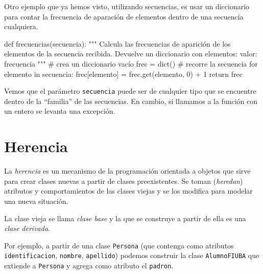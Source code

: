 Otro ejemplo que ya hemos visto, utilizando secuencias, es usar un
diccionario para contar la frecuencia de aparación de elementos dentro de
una secuencia cualquiera.

\begin{codigo-python}
def frecuencias(secuencia):
    """ Calcula las frecuencias de aparición de los elementos de
        la secuencia recibida.
        Devuelve un diccionario con elementos: {valor: frecuencia}
    """
    # crea un diccionario vacío
    frec = dict()
    # recorre la secuencia
    for elemento in secuencia:
        frec[elemento] = frec.get(elemento, 0) + 1
    return frec
\end{codigo-python}

Vemos que el parámetro \lstinline!secuencia! puede ser de cualquier tipo
que se encuentre dentro de la ``familia'' de las secuencias. En cambio, si
llamamos a la función con un entero se levanta una excepción.


\section{Herencia}

La {\it herencia} es un mecanismo de la programación orientada a objetos que
sirve para crear clases nuevas a partir de clases preexistentes.  Se toman
({\it heredan}) atributos y comportamientos de las clases viejas y se los
modifica para modelar una nueva situación.

La clase vieja se llama {\it clase base} y la que se construye a partir de
ella es una {\it clase derivada}.

Por ejemplo, a partir de una clase \lstinline!Persona! (que contenga como
atributos \lstinline!identificacion!, \lstinline!nombre!, \lstinline!apellido!)
podemos construir la clase \lstinline!AlumnoFIUBA! que extiende a
\lstinline!Persona! y agrega como atributo el \lstinline!padron!.

